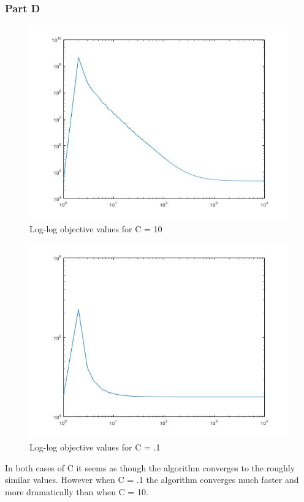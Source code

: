 \documentclass[11pt, oneside]{article}   	%
\begin{document}
\subsubsection{Part D}
\begin{figure}[h!]
  \includegraphics[width=\linewidth]{objective_10.jpg}
  \caption{Log-log objective values for C = 10}
\end{figure}

\newpage{}
\begin{figure}[h!]
  \includegraphics[width=\linewidth]{objective_01.jpg}
  \caption{Log-log objective values for C = .1}
\end{figure}
In both cases of C it seems as though the algorithm converges to the roughly similar values.  However when C = .1 the algorithm converges much faster and more dramatically than when C = 10.
\end{document}
